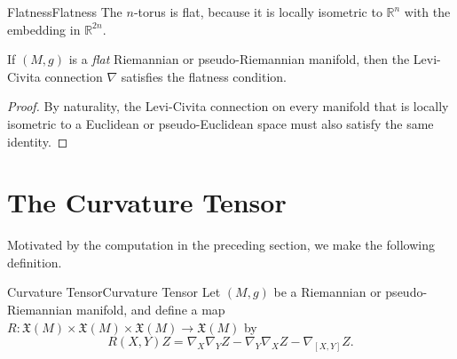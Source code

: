 \documentclass[../main.tex]{subfiles}
\begin{document}
\begin{example}{Flatness}{Flatness}
	The $n$-torus is flat, because it is locally isometric to $\mathbb{R}^n$ with the embedding in $\mathbb{R}^{2n}$.
\end{example}

\begin{proposition}{}{}
	If $(M, g)$ is a \emph{flat} Riemannian or pseudo-Riemannian manifold, then the Levi-Civita connection $\nabla$ satisfies the flatness condition.
\end{proposition}
\begin{proof}
	By naturality, the Levi-Civita connection on every manifold that is locally isometric to a Euclidean or pseudo-Euclidean space must also satisfy the same identity.
\end{proof}

\section{The Curvature Tensor}
Motivated by the computation in the preceding section, we make the following definition.
\begin{definition}{Curvature Tensor}{Curvature Tensor}
	Let $(M, g)$ be a Riemannian or pseudo-Riemannian manifold, and define a map $R: \mathfrak{X}(M) \times \mathfrak{X}(M) \times \mathfrak{X}(M) \to \mathfrak{X}(M)$ by
	\begin{equation}
		R(X, Y)Z = \nabla_X \nabla_Y Z - \nabla_Y \nabla_X Z - \nabla_{[X, Y]} Z.
	\end{equation}
\end{definition}
\end{document}
